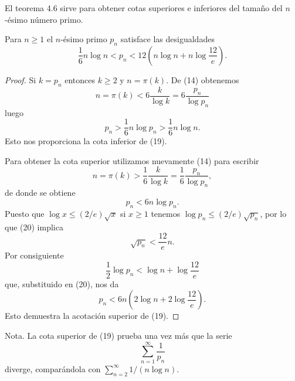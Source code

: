 \documentclass[12pt,a4paper]{book}
\begin{document}
    El teorema 4.6 sirve para obtener cotas superiores e inferiores del tamaño del
    $n$-ésimo número primo.

    \begin{teorema}
        Para $n\geq1$ el $n$-ésimo primo $p_n$ satisface las desigualdades
        \begin{equation}
            \frac{1}{6}n\log n<p_n<12\left(n\log n+n\log\frac{12}{e}\right).
        \end{equation}
    \end{teorema}

    \begin{proof}
        Si $k=p_n$ entonces $k\geq2$ y $n=\pi(k)$. De (14) obtenemos
        \begin{equation*}
            n=\pi(k)<6\frac{k}{\log k}=6\frac{p_n}{\log p_n}
        \end{equation*}
        luego
        \begin{equation*}
            p_n>\frac{1}{6}n\log p_n>\frac{1}{6}n\log n.
        \end{equation*}
        Esto nos proporciona la cota inferior de (19).

        Para obtener la cota superior utilizamos nuevamente (14) para escribir
        \begin{equation*}
            n=\pi(k)>\frac{1}{6}\frac{k}{\log k}=\frac{1}{6}\frac{p_n}{\log p_n},
        \end{equation*}
        de donde se obtiene
        \begin{equation}
            p_n<6n\log p_n.
        \end{equation}
        Puesto que $\log x\leq(2/e)\sqrt{x}$ si $x\geq1$ tenemos $\log p_n\leq(2/e)\sqrt{p_n}$,
        por lo que (20) implica
        \begin{equation*}
            \sqrt{p_n}<\frac{12}{e}n.
        \end{equation*}
        Por consiguiente
        \begin{equation*}
            \frac{1}{2}\log p_n<\log n+\log\frac{12}{e}
        \end{equation*}
        que, substituido en (20), nos da
        \begin{equation*}
            p_n<6n\left(2\log n+2\log\frac{12}{e}\right).
        \end{equation*}
        Esto demuestra la acotación superior de (19).
    \end{proof}

    Nota. La cota superior de (19) prueba una vez más que la serie
    \begin{equation*}
        \sum_{n=1}^{\infty}\frac{1}{p_n}
    \end{equation*}
    diverge, comparándola con $\sum_{n=2}^{\infty}1/(n\log n)$.
\end{document}
